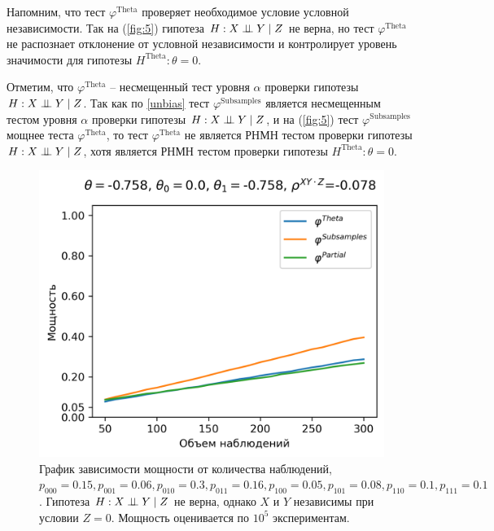 Напомним, что тест 
$\varphi^{\text{Theta}}$ проверяет необходимое условие условной
независимости. Так на (\autoref{fig:5}) гипотеза 
$H: X \perp\!\!\!\perp Y \mid Z$ не верна, 
но тест $\varphi^{\text{Theta}}$
не распознает отклонение от условной независимости и контролирует уровень значимости для гипотезы $H^{\text{Theta}}: \theta=0$.

Отметим, что $\varphi^{\text{Theta}}$ -- несмещенный тест уровня
$\alpha$ проверки гипотезы $H: X \perp\!\!\!\perp Y \mid Z$.
Так как по \autoref{unbias} тест $\varphi^{\text{Subsamples}}$
является несмещенным тестом уровня $\alpha$ проверки гипотезы $H: X \perp\!\!\!\perp Y \mid Z$, и 
на (\autoref{fig:5})
тест $\varphi^{\text{Subsamples}}$ мощнее теста $\varphi^{\text{Theta}}$,
то тест $\varphi^{\text{Theta}}$ не является РНМН тестом проверки 
гипотезы $H: X \perp\!\!\!\perp Y \mid Z$, хотя является РНМН тестом
проверки гипотезы $H^{\text{Theta}}: \theta=0$.

\begin{figure}[H]
    \centering
    \includegraphics[scale=0.55]{images/graph3.png}
    \caption{График зависимости мощности от количества наблюдений,
    $p_{000}=0.15, p_{001}=0.06, 
    p_{010}=0.3, p_{011}=0.16,
    p_{100}=0.05, p_{101}=0.08, p_{110}=0.1, p_{111}=0.1$. 
    Гипотеза $H: X \perp\!\!\!\perp Y \mid Z$ не верна, однако $X$ и $Y$ независимы
    при условии $Z=0$. 
    Мощность оценивается по $10^5$ экспериментам.}\label{fig:3}
\end{figure}

